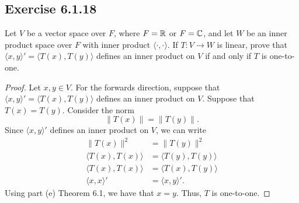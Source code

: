 \subsection*{Exercise 6.1.18} Let \( V  \) be a vector space over \( F  \), where \( F = \mathbb{R}  \) or \( F = \mathbb{C}  \), and let \( W  \) be an inner product space over \( F  \) with inner product \( \langle \cdot  ,  \cdot  \rangle \). If \( T: V \to W  \) is linear, prove that \( \langle x , y \rangle' = \langle T(x)  , T(y) \rangle \) defines an inner product on \( V  \) if and only if \( T  \) is one-to-one.
\begin{proof}
    Let \( x,y \in V  \). For the forwards direction, suppose that \( \langle x , y \rangle' = \langle  T(x)  , T(y) \rangle \) defines an inner product on \( V  \). Suppose that \( T(x) = T(y) \). Consider the norm
    \[  \|T(x)\| = \|T(y)\|.  \]
Since \( \langle x , y \rangle'  \) defines an inner product on \( V  \), we can write
\begin{align*}
    \|T(x) \|^{2} &= \|T(y)\|^{2} \\
    \langle T(x)  , T(x)  \rangle &= \langle T(y) , T(y) \rangle\\
    \langle T(x)  , T(x)  \rangle &= \langle T(x) , T(y) \rangle\\
    \langle x , x \rangle' &= \langle x , y \rangle'.
\end{align*}
Using part (e) Theorem 6.1, we have that \( x = y  \). Thus, \( T  \) is one-to-one. 


\end{proof}
